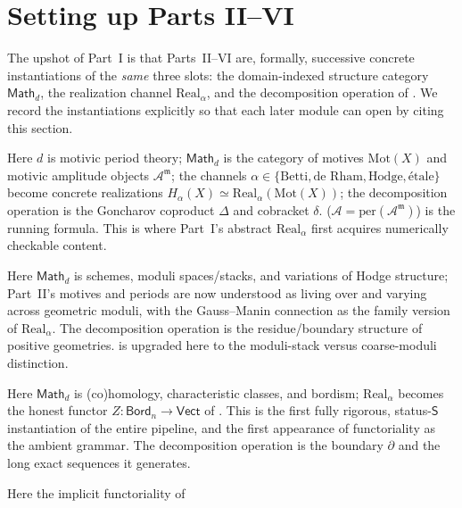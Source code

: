 \documentclass[12pt]{article}
\theoremstyle{definition}
\theoremstyle{remark}
\newcommand{\Math}{\mathsf{Math}}
\newcommand{\Vect}{\mathsf{Vect}}
\newcommand{\Bord}{\mathsf{Bord}}
\newcommand{\Real}{\mathrm{Real}}
\newcommand{\per}{\mathrm{per}}
\newcommand{\Sstat}{\mathsf{S}}
\begin{document}
\section{Setting up Parts II--VI}
\label{sec:parts}

The upshot of Part~I is that Parts~II--VI are, formally, successive
concrete instantiations of the \emph{same} three slots: the domain-indexed
structure category $\Math_d$, the realization channel $\Real_\alpha$, and the
decomposition operation of . We record the instantiations
explicitly so that each later module can open by citing this section.

\begin{description}[leftmargin=1.4em, style=nextline]
\item[Part~II (Motives, periods, amplitudes).] Here $d$ is motivic period
  theory; $\Math_d$ is the category of motives $\mathrm{Mot}(X)$ and motivic
  amplitude objects $\mathcal{A}^{\mathfrak m}$; the channels $\alpha \in
  \{\text{Betti}, \text{de Rham}, \text{Hodge}, \text{\'etale}\}$ become concrete
  realizations $H_\alpha(X) \simeq \Real_\alpha(\mathrm{Mot}(X))$; the
  decomposition operation is the Goncharov coproduct $\Delta$ and cobracket
  $\delta$.  ($\mathcal{A} = \per(\mathcal{A}^{\mathfrak m})$)
  is the running formula. This is where Part~I's abstract $\Real_\alpha$ first
  acquires numerically checkable content.
\item[Part~III (Algebraic geometry).] Here $\Math_d$ is schemes, moduli
  spaces/stacks, and variations of Hodge structure; Part~II's motives and
  periods are now understood as living over and varying across geometric moduli,
  with the Gauss--Manin connection as the family version of $\Real_\alpha$. The
  decomposition operation is the residue/boundary structure of positive
  geometries.  is upgraded here to the moduli-stack versus
  coarse-moduli distinction.
\item[Part~IV (Algebraic topology).] Here $\Math_d$ is (co)homology,
  characteristic classes, and bordism; $\Real_\alpha$ becomes the honest functor
  $Z : \Bord_n \to \Vect$ of . This is the first fully rigorous,
  status-$\Sstat$ instantiation of the entire pipeline, and the first appearance
  of functoriality as the ambient grammar. The decomposition operation is the
  boundary $\partial$ and the long exact sequences it generates.
\item[Part~V (Category theory \& HoTT).] Here the implicit functoriality of

\end{description}
\end{document}
